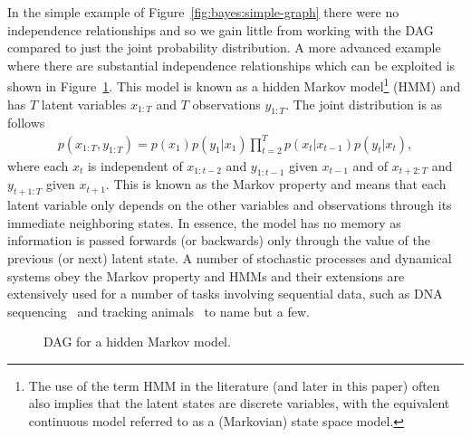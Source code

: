 In the simple example of Figure~\ref{fig:bayes:simple-graph} there were no independence relationships and so
we gain little from working with the DAG compared to just the joint probability distribution.
A more advanced example where there are substantial independence relationships which can
be exploited is shown in Figure~\ref{fig:bayes:hmm}.
  This model is known as a hidden Markov 
model\footnote{The use of the term HMM in the literature (and later in this paper) often also implies that
	the latent states are discrete variables, with the equivalent continuous model referred to as a
	(Markovian) state space model.} (HMM)
and has $T$ latent variables $x_{1:T}$ and $T$ observations $y_{1:T}$.  The joint distribution is as follows
\begin{align}
\label{eq:bayes:hmm}
p(x_{1:T},y_{1:T}) = p(x_1) p(y_1|x_1)\prod_{t=2}^{T} p(x_t|x_{t-1})p(y_t|x_t),
\end{align}
where each $x_t$ is
independent of $x_{1:{t-2}}$ and $y_{1:t-1}$ given $x_{t-1}$ and of $x_{t+2:T}$ and $y_{{t+1}:T}$ given $x_{t+1}$.
This is known as the Markov property and means that each latent variable only depends on the other
variables and observations through its immediate neighboring states.  In essence, the model has no memory as information
is passed forwards (or backwards) only through the value of the previous (or next) latent state.  A number of stochastic
processes and dynamical systems obey the Markov property and HMMs and their extensions are extensively used for
a number of tasks involving sequential data, such as DNA sequencing~\citep{durbin1998biological} and tracking
animals~\citep{dhir2016tracking,dhir2017interpreting} to name but a few. 

\begin{figure}[t]
	\centering 
	
	\caption{DAG for a hidden Markov model.
		\label{fig:bayes:hmm}}
\end{figure}

